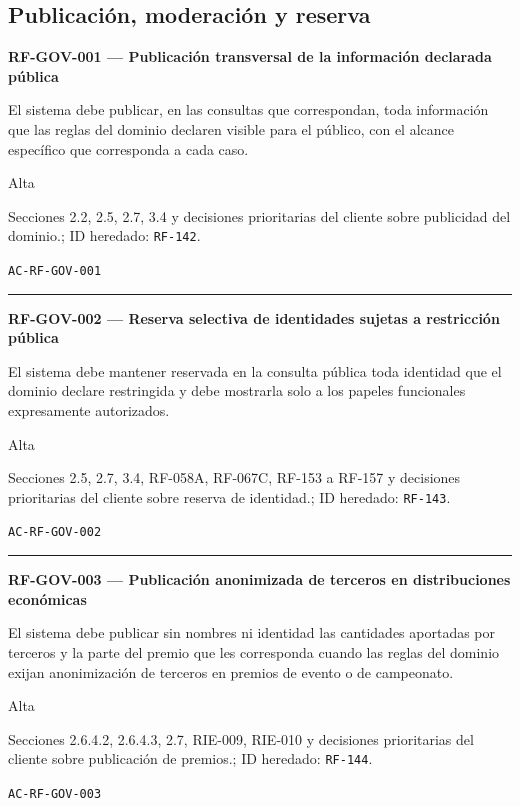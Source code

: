 \documentclass[10pt,letterpaper]{article}
\begin{document}
\subsection{Publicación, moderación y reserva}
\noindent\textbf{RF-GOV-001 --- Publicación transversal de la información declarada pública}\par
\begin{description}[style=nextline,leftmargin=3.15cm,labelwidth=2.8cm,font=\normalfont\bfseries]
\item[Obligación] El sistema debe publicar, en las consultas que correspondan, toda información que las reglas del dominio declaren visible para el público, con el alcance específico que corresponda a cada caso.
\item[Prioridad] Alta
\item[Procedencia] Secciones 2.2, 2.5, 2.7, 3.4 y decisiones prioritarias del cliente sobre publicidad del dominio.; ID heredado: \texttt{RF-142}.
\item[Verificación] \texttt{AC-RF-GOV-001}
\end{description}
\vspace{0.25em}\hrule\vspace{0.65em}
\noindent\textbf{RF-GOV-002 --- Reserva selectiva de identidades sujetas a restricción pública}\par
\begin{description}[style=nextline,leftmargin=3.15cm,labelwidth=2.8cm,font=\normalfont\bfseries]
\item[Obligación] El sistema debe mantener reservada en la consulta pública toda identidad que el dominio declare restringida y debe mostrarla solo a los papeles funcionales expresamente autorizados.
\item[Prioridad] Alta
\item[Procedencia] Secciones 2.5, 2.7, 3.4, RF-058A, RF-067C, RF-153 a RF-157 y decisiones prioritarias del cliente sobre reserva de identidad.; ID heredado: \texttt{RF-143}.
\item[Verificación] \texttt{AC-RF-GOV-002}
\end{description}
\vspace{0.25em}\hrule\vspace{0.65em}
\noindent\textbf{RF-GOV-003 --- Publicación anonimizada de terceros en distribuciones económicas}\par
\begin{description}[style=nextline,leftmargin=3.15cm,labelwidth=2.8cm,font=\normalfont\bfseries]
\item[Obligación] El sistema debe publicar sin nombres ni identidad las cantidades aportadas por terceros y la parte del premio que les corresponda cuando las reglas del dominio exijan anonimización de terceros en premios de evento o de campeonato.
\item[Prioridad] Alta
\item[Procedencia] Secciones 2.6.4.2, 2.6.4.3, 2.7, RIE-009, RIE-010 y decisiones prioritarias del cliente sobre publicación de premios.; ID heredado: \texttt{RF-144}.
\item[Verificación] \texttt{AC-RF-GOV-003}
\end{description}
\end{document}
